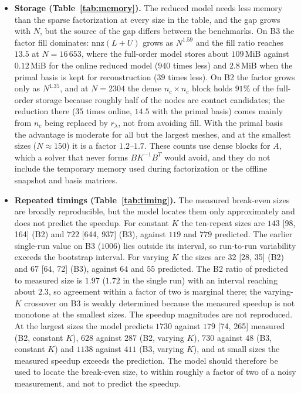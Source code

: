 \documentclass[11pt,a4paper]{article}
\providecommand{\tightlist}{\setlength{\itemsep}{0pt}\setlength{\parskip}{0pt}}
\begin{document}
\begin{itemize}
\tightlist
\item
  \textbf{Storage (Table~\ref{tab:memory}).} The reduced model needs less memory than the sparse factorization at every size in the table, and the gap grows with $N$, but the source of the gap differs between the benchmarks. On B3 the factor fill dominates: $\mathrm{nnz}(L+U)$ grows as $N^{1.59}$ and the fill ratio reaches $13.5$ at $N=16\,653$, where the full-order model stores about $109$\,MiB against $0.12$\,MiB for the online reduced model ($940$ times less) and $2.8$\,MiB when the primal basis is kept for reconstruction ($39$ times less). On B2 the factor grows only as $N^{1.35}$, and at $N=2304$ the dense $n_c\times n_c$ block holds $91\%$ of the full-order storage because roughly half of the nodes are contact candidates; the reduction there ($35$ times online, $14.5$ with the primal basis) comes mainly from $n_c$ being replaced by $r_\lambda$, not from avoiding fill. With the primal basis the advantage is moderate for all but the largest meshes, and at the smallest sizes ($N\approx 150$) it is a factor $1.2$--$1.7$. These counts use dense blocks for $A$, which a solver that never forms $BK^{-1}B^T$ would avoid, and they do not include the temporary memory used during factorization or the offline snapshot and basis matrices.
\item
  \textbf{Repeated timings (Table~\ref{tab:timing}).} The measured break-even sizes are broadly reproducible, but the model locates them only approximately and does not predict the speedup. For constant $K$ the ten-repeat sizes are $143$ [98, 164] (B2) and $722$ [644, 937] (B3), against $119$ and $779$ predicted. The earlier single-run value on B3 ($1006$) lies outside its interval, so run-to-run variability exceeds the bootstrap interval. For varying $K$ the sizes are $32$ [28, 35] (B2) and $67$ [64, 72] (B3), against $64$ and $55$ predicted. The B2 ratio of predicted to measured size is $1.97$ ($1.72$ in the single run) with an interval reaching about $2.3$, so agreement within a factor of two is marginal there; the varying-$K$ crossover on B3 is weakly determined because the measured speedup is not monotone at the smallest sizes. The speedup magnitudes are not reproduced. At the largest sizes the model predicts $1730$ against $179$ [74, 265] measured (B2, constant $K$), $628$ against $287$ (B2, varying $K$), $730$ against $48$ (B3, constant $K$) and $1138$ against $411$ (B3, varying $K$), and at small sizes the measured speedup exceeds the prediction. The model should therefore be used to locate the break-even size, to within roughly a factor of two of a noisy measurement, and not to predict the speedup.

\end{itemize}
\end{document}
